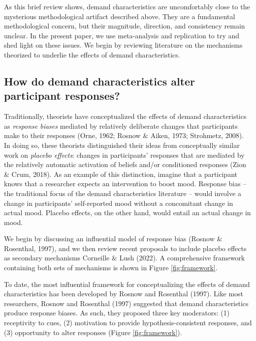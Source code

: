 \documentclass[
  man,floatsintext]{apa6}
\begin{document}
As this brief review shows, demand characteristics are uncomfortably close to the mysterious methodological artifact described above. They are a fundamental methodological concern, but their magnitude, direction, and consistency remain unclear. In the present paper, we use meta-analysis and replication to try and shed light on these issues. We begin by reviewing literature on the mechanisms theorized to underlie the effects of demand characteristics.

\hypertarget{how-do-demand-characteristics-alter-participant-responses}{%
\subsection{How do demand characteristics alter participant responses?}\label{how-do-demand-characteristics-alter-participant-responses}}

Traditionally, theorists have conceptualized the effects of demand characteristics as \emph{response biases} mediated by relatively deliberate changes that participants make to their responses (Orne, 1962; Rosnow \& Aiken, 1973; Strohmetz, 2008). In doing so, these theorists distinguished their ideas from conceptually similar work on \emph{placebo effects}: changes in participants' responses that are mediated by the relatively automatic activation of beliefs and/or conditioned responses (Zion \& Crum, 2018). As an example of this distinction, imagine that a participant knows that a researcher expects an intervention to boost mood. Response bias -- the traditional focus of the demand characteristics literature -- would involve a change in participants' self-reported mood without a concomitant change in actual mood. Placebo effects, on the other hand, would entail an actual change in mood.

We begin by discussing an influential model of response bias (Rosnow \& Rosenthal, 1997), and we then review recent proposals to include placebo effects as secondary mechanisms Corneille \& Lush (2022). A comprehensive framework containing both sets of mechanisms is shown in Figure \ref{fig:framework}.

To date, the most influential framework for conceptualizing the effects of demand characteristics has been developed by Rosnow and Rosenthal (1997). Like most researchers, Rosnow and Rosenthal (1997) suggested that demand characteristics produce response biases. As such, they proposed three key moderators: (1) receptivity to cues, (2) motivation to provide hypothesis-consistent responses, and (3) opportunity to alter responses (Figure \ref{fig:framework}).
\end{document}
